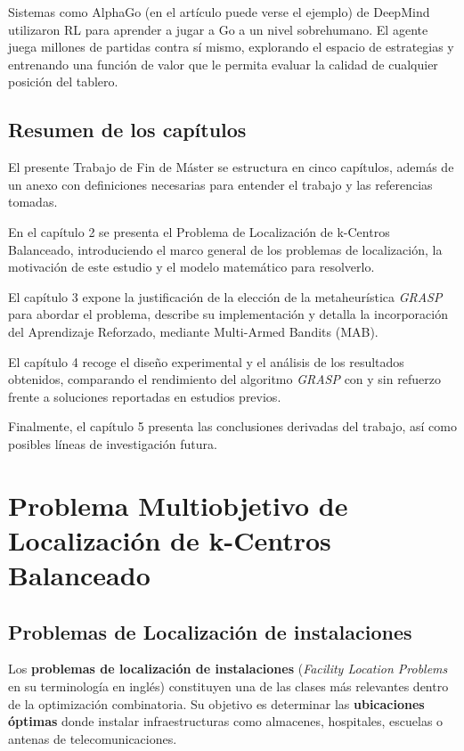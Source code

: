 \documentclass[12pt,a4paper]{book}
\begin{document}
Sistemas como AlphaGo (en el artículo \cite{AlphaGo} puede verse el ejemplo) de DeepMind utilizaron RL para aprender a jugar a Go a un nivel sobrehumano.
El agente juega millones de partidas contra sí mismo, explorando el espacio de estrategias y entrenando una función de valor que le permita evaluar la calidad de cualquier posición del tablero.


\section{Resumen de los capítulos}
El presente Trabajo de Fin de Máster se estructura en cinco capítulos, además de un anexo con definiciones necesarias para entender el trabajo y las referencias tomadas.

En el capítulo 2 se presenta el Problema de Localización de k-Centros Balanceado, introduciendo el marco general de los problemas de localización, la motivación de este estudio y el modelo matemático para resolverlo.

El capítulo 3 expone la justificación de la elección de la metaheurística \textit{GRASP} para abordar el problema, describe su implementación y detalla la incorporación del Aprendizaje Reforzado, mediante Multi-Armed Bandits (MAB).

El capítulo 4 recoge el diseño experimental y el análisis de los resultados obtenidos, comparando el rendimiento del algoritmo \textit{GRASP} con y sin refuerzo frente a soluciones reportadas en estudios previos.

Finalmente, el capítulo 5 presenta las conclusiones derivadas del trabajo, así como posibles líneas de investigación futura.

\chapter{Problema Multiobjetivo de Localización de k-Centros Balanceado}

\section{Problemas de Localización de instalaciones}

Los \textbf{problemas de localización de instalaciones} (\textit{Facility Location Problems} en su terminología en inglés) constituyen una de las clases más relevantes dentro de la optimización combinatoria. Su objetivo es determinar las \textbf{ubicaciones óptimas} donde instalar infraestructuras como almacenes, hospitales, escuelas o antenas de telecomunicaciones.
\end{document}
